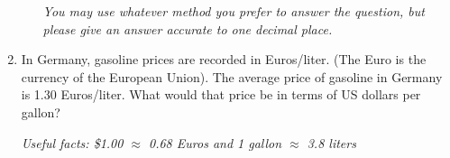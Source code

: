 \documentclass[12pt]{article}
\begin{document}
\begin{enumerate}
\begin{enumerate}
\emph{You may use whatever method you prefer to answer the question, but please give an answer accurate to one decimal place.}
\vfill

\end{enumerate}



\noindent \hrulefill
\item In Germany, gasoline prices are recorded in Euros/liter.  (The Euro is the currency of the European Union).  The average price of gasoline in Germany is 1.30 Euros/liter.  What would that price be in terms of US dollars per gallon?

\emph{Useful facts:  \$1.00 $\approx$ 0.68 Euros and 1 gallon $\approx$ 3.8 liters }
\vfill


\end{enumerate}




\newpage
\end{document}
